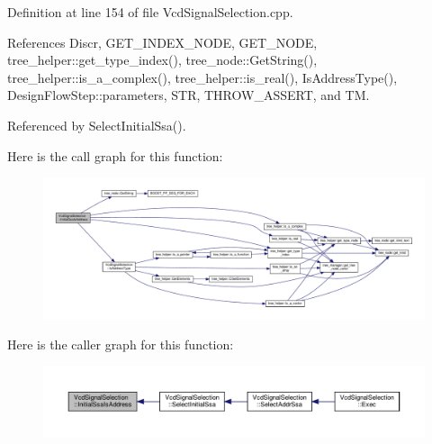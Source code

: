 Definition at line 154 of file Vcd\+Signal\+Selection.\+cpp.



References Discr, G\+E\+T\+\_\+\+I\+N\+D\+E\+X\+\_\+\+N\+O\+DE, G\+E\+T\+\_\+\+N\+O\+DE, tree\+\_\+helper\+::get\+\_\+type\+\_\+index(), tree\+\_\+node\+::\+Get\+String(), tree\+\_\+helper\+::is\+\_\+a\+\_\+complex(), tree\+\_\+helper\+::is\+\_\+real(), Is\+Address\+Type(), Design\+Flow\+Step\+::parameters, S\+TR, T\+H\+R\+O\+W\+\_\+\+A\+S\+S\+E\+RT, and TM.



Referenced by Select\+Initial\+Ssa().

Here is the call graph for this function\+:
\nopagebreak
\begin{figure}[H]
\begin{center}
\leavevmode
\includegraphics[width=350pt]{dd/de4/classVcdSignalSelection_a74df1de6a56940a7fa4e712fc22d9e02_cgraph}
\end{center}
\end{figure}
Here is the caller graph for this function\+:
\nopagebreak
\begin{figure}[H]
\begin{center}
\leavevmode
\includegraphics[width=350pt]{dd/de4/classVcdSignalSelection_a74df1de6a56940a7fa4e712fc22d9e02_icgraph}
\end{center}
\end{figure}
\mbox{\label{classVcdSignalSelection_aa804b30439f86e4f9f2de7a57dd206d7}} 
